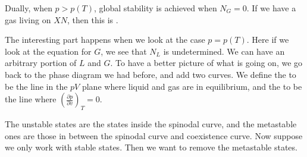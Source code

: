 \documentclass[a4paper]{article}
\begin{document}
Dually, when $p > p(T)$, global stability is achieved when $N_G = 0$. If we have a gas living on $XN$, then this is .

The interesting part happens when we look at the case $p = p(T)$. Here if we look at the equation for $G$, we see that $N_L$ is undetermined. We can have an arbitrary portion of $L$ and $G$. To have a better picture of what is going on, we go back to the phase diagram we had before, and add two curves. We define the  to be the line in the $pV$ plane where liquid and gas are in equilibrium, and the  to be the line where $\left(\frac{\partial p}{\partial v}\right)_T = 0$.
\begin{center}
\end{center}
The unstable states are the states inside the spinodal curve, and the metastable ones are those in between the spinodal curve and coexistence curve. Now suppose we only work with stable states. Then we want to remove the metastable states.
\end{document}
